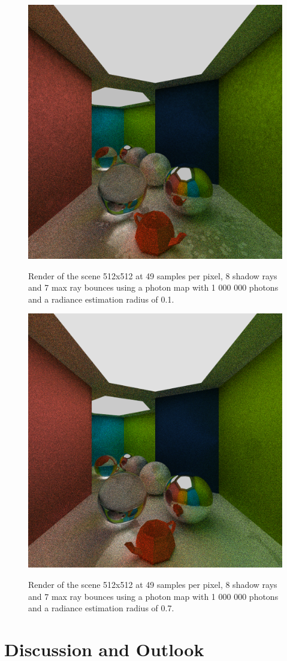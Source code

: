 \documentclass[a4paper, twocolumn]{article}
\begin{document}
            \begin{figure}[H]
                \centering
                \caption{Render of the scene 512x512 at 49 samples per pixel, 8 shadow rays and 7 max ray bounces using a photon map with 1 000 000 photons and a radiance estimation radius of 0.1.}
                \includegraphics[width=0.8\linewidth]{share/results/photons_0_1.png}
                \label{fig:photons_0_1}
            \end{figure}

             \begin{figure}[H]
                \centering
                \caption{Render of the scene 512x512 at 49 samples per pixel, 8 shadow rays and 7 max ray bounces using a photon map with 1 000 000 photons and a radiance estimation radius of 0.7.}
                \includegraphics[width=0.8\linewidth]{share/results/photons_0_7.png}
                \label{fig:photons_0_7}
            \end{figure}

    \section{Discussion and Outlook} \label{sec:discussion_and_outlook}

    \newpage %
    \nocite{*} %
    
    
\end{document}
